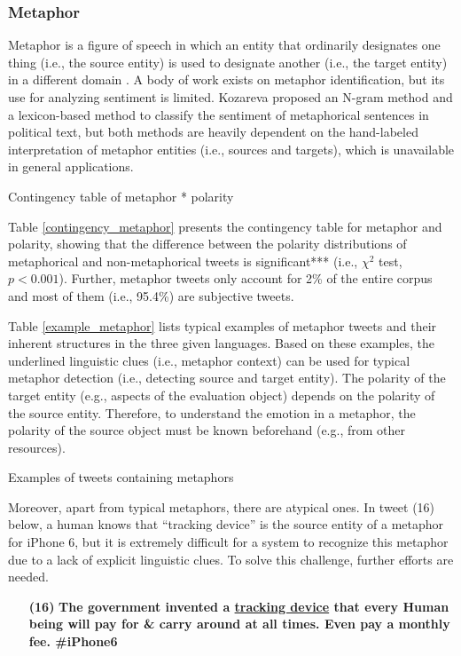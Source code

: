 \documentclass[english]{jnlp_1.4}
\begin{document}
\subsubsection{Metaphor}

Metaphor is a figure of speech in which an entity that ordinarily designates one thing (i.e., the source entity) is used to designate another (i.e., the target entity) in a different domain \cite{Lakoff80,Martin88}. A body of work exists on metaphor identification, but its use for analyzing sentiment is limited. Kozareva \citeyear{Kozareva13} proposed an N-gram method and a lexicon-based method to classify the sentiment of metaphorical sentences in political text, but both methods are heavily dependent on the hand-labeled interpretation of metaphor entities (i.e., sources and targets), which is unavailable in general applications.

\begin{table}[b]
\caption{Contingency table of metaphor * polarity}
\label{contingency_metaphor}

\end{table}

Table \ref{contingency_metaphor} presents the contingency table for metaphor and polarity, showing that the difference between the polarity distributions of metaphorical and non-metaphorical tweets is significant*** (i.e., $\chi^2$ test, $p < 0.001$). Further, metaphor tweets only account for 2\% of the entire corpus and most of them (i.e., 95.4\%) are subjective tweets.

Table \ref{example_metaphor} lists typical examples of metaphor tweets and their inherent structures in the three given languages. Based on these examples, the underlined linguistic clues (i.e., metaphor context) can be used for typical metaphor detection (i.e., detecting source and target entity). The polarity of the target entity (e.g., aspects of the evaluation object) depends on the polarity of the source entity. Therefore, to understand the emotion in a metaphor, the polarity of the source object must be known beforehand (e.g., from other resources).

\begin{table}[b]
\caption{Examples of tweets containing metaphors}
\label{example_metaphor}

\end{table}

Moreover, apart from typical metaphors, there are atypical ones. In tweet (16) below, a human knows that ``tracking device'' is the source entity of a metaphor for iPhone 6, but it is extremely difficult for a system to recognize this metaphor due to a lack of explicit linguistic clues. To solve this challenge, further efforts are needed.
\begin{enumerate}
\item[{\bf (16)}] {\bf The government invented a \underline{tracking device} that every Human being will pay for \& carry around at all times. Even pay a monthly fee. \#iPhone6}
\end{enumerate}
\end{document}
